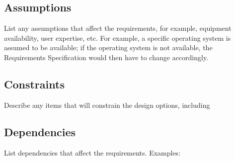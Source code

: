 \subsection{Assumptions}
List any assumptions that affect the requirements, for example, equipment availability, user expertise, etc.  For example, a specific operating system is assumed to be available; if  the operating system is not available, the Requirements Specification would then have to change accordingly.

\subsection{Constraints}
Describe any items that will constrain the design options, including

\subsection{Dependencies}
List dependencies that affect the requirements.  Examples: